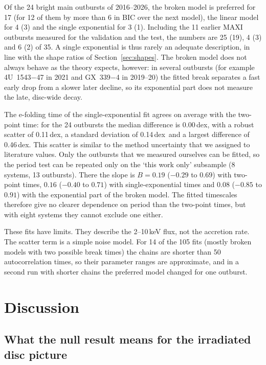 \documentclass[fleqn,usenatbib]{mnras}
\newcommand{\dex}{\,dex}
\begin{document}
Of the 24 bright main outbursts of 2016--2026, the broken model is preferred for 17 (for 12 of them by more than 6 in BIC over the next model), the linear model for 4 (3) and the single exponential for 3 (1). Including the 11 earlier MAXI outbursts measured for the validation and the test, the numbers are 25 (19), 4 (3) and 6 (2) of 35. A single exponential is thus rarely an adequate description, in line with the shape ratios of Section~\ref{sec:shapes}. The broken model does not always behave as the theory expects, however: in several outbursts (for example 4U~1543$-$47 in 2021 and GX~339$-$4 in 2019--20) the fitted break separates a fast early drop from a slower later decline, so its exponential part does not measure the late, disc-wide decay.

The e-folding time of the single-exponential fit agrees on average with the two-point time: for the 24 outbursts the median difference is 0.00\dex, with a robust scatter of 0.11\dex, a standard deviation of 0.14\dex\ and a largest difference of 0.46\dex. This scatter is similar to the method uncertainty that we assigned to literature values. Only the outbursts that we measured ourselves can be fitted, so the period test can be repeated only on the `this work only' subsample (8 systems, 13 outbursts). There the slope is $B=0.19$ ($-0.29$ to $0.69$) with two-point times, $0.16$ ($-0.40$ to $0.71$) with single-exponential times and $0.08$ ($-0.85$ to $0.91$) with the exponential part of the broken model. The fitted timescales therefore give no clearer dependence on period than the two-point times, but with eight systems they cannot exclude one either.

These fits have limits. They describe the 2--10\,keV flux, not the accretion rate. The scatter term is a simple noise model. For 14 of the 105 fits (mostly broken models with two possible break times) the chains are shorter than 50 autocorrelation times, so their parameter ranges are approximate, and in a second run with shorter chains the preferred model changed for one outburst.

\section{Discussion}
\label{sec:discussion}

\subsection{What the null result means for the irradiated disc picture}
\label{sec:physics}
\end{document}
